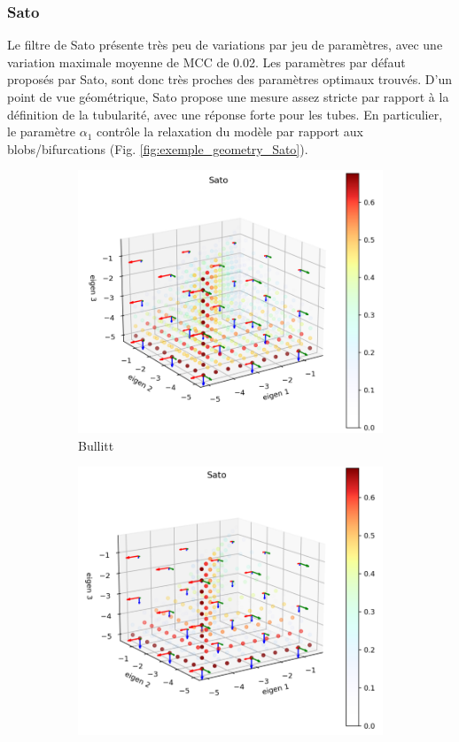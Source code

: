 \subsubsection{Sato}
Le filtre de Sato présente très peu de variations par jeu de paramètres, avec une variation maximale moyenne de MCC de 0.02. Les paramètres par défaut proposés par Sato, sont donc très proches des paramètres optimaux trouvés. D'un point de vue géométrique, Sato propose une mesure assez stricte par rapport à la définition de la tubularité, avec une réponse forte pour les tubes. En particulier, le paramètre $\alpha_1$ contrôle la relaxation du modèle par rapport aux blobs/bifurcations (Fig. \ref{fig:exemple_geometry_Sato}).
\begin{figure}[!ht]
  \captionsetup[subfigure]{justification=centering}
  \centering
  \begin{subfigure}[t]{0.45\textwidth}
    \includegraphics[width=\textwidth]{Images/Bullitt_Sato_BP.png}
    \caption{Bullitt}
  \end{subfigure}
  \begin{subfigure}[t]{0.45\textwidth}
    \includegraphics[width=\textwidth]{Images/Ircad_Sato_BP.png}

\end{subfigure}
\end{figure}
